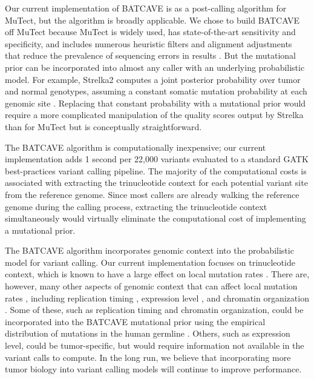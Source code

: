 \documentclass[a4,center,fleqn]{NAR}
\newcommand{\batcave}{BATCAVE\xspace}
\begin{document}
Our current implementation of \batcave is as a post-calling algorithm for MuTect, but the algorithm is broadly applicable.
We chose to build \batcave off MuTect because MuTect is widely used, has state-of-the-art sensitivity and specificity, and includes numerous heuristic filters and alignment adjustments that reduce the prevalence of sequencing errors in results \cite{Cibulskis2013,Griffith2015}.
But the mutational prior can be incorporated into almost any caller with an underlying probabilistic model.
For example, Strelka2 computes a joint posterior probability over tumor and normal genotypes, assuming a constant somatic mutation probability at each genomic site \cite{Kim2018}.
Replacing that constant probability with a mutational prior would require a more complicated manipulation of the quality scores output by Strelka than for MuTect but is conceptually straightforward.

The \batcave algorithm is computationally inexpensive; our current implementation adds 1 second per 22,000 variants evaluated to a standard GATK best-practices variant calling pipeline.
The majority of the computational costs is associated with extracting the trinucleotide context for each potential variant site from the reference genome.
Since most callers are already walking the reference genome during the calling process, extracting the trinucleotide context simultaneously would virtually eliminate the computational cost of implementing a mutational prior.

The \batcave algorithm incorporates genomic context into the probabilistic model for variant calling.
Our current implementation focuses on trinucleotide context, which is known to have a large effect on local mutation rates \cite{Martincorena2015,Hollstein2017}.
There are, however, many other aspects of genomic context that can affect local mutation rates \citep{Buisson2019}, including replication timing \citep{Stamatoyannopoulos2009}, expression level \citep{Pleasance2010}, and chromatin organization \citep{Schuster-Bockler2012}. 
Some of these, such as replication timing and chromatin organization, could be incorporated into the \batcave mutational prior using the empirical distribution of mutations in the human germline \cite{Hodgkinson2011}.
Others, such as expression level, could be tumor-specific, but would require information not available in the variant calls to compute.
In the long run, we believe that incorporating more tumor biology into variant calling models will continue to improve performance.
\end{document}
